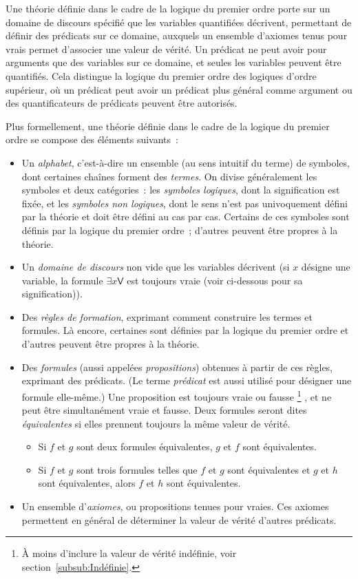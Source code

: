 Une théorie définie dans le cadre de la logique du premier ordre porte sur un domaine de discours spécifié que les variables quantifiées décrivent, permettant de définir des prédicats sur ce domaine, auxquels un ensemble d'axiomes tenus pour vrais permet d'associer une valeur de vérité. 
Un prédicat ne peut avoir pour arguments que des variables sur ce domaine, et seules les variables peuvent être quantifiés. 
Cela distingue la logique du premier ordre des logiques d'ordre supérieur, où un prédicat peut avoir un prédicat plus général comme argument ou des quantificateurs de prédicats peuvent être autorisés.

Plus formellement, une théorie définie dans le cadre de la logique du premier ordre se compose des éléments suivants : 
\begin{itemize}[nosep]
    \item Un \textit{alphabet}, c'est-à-dire un ensemble (au sens intuitif du terme) de symboles, dont certaines chaînes forment des \textit{termes}. 
          On divise généralement les symboles et deux catégories : les \textit{symboles logiques}, dont la signification est fixée, et les \textit{symboles non logiques}, dont le sens n'est pas univoquement défini par la théorie et doit être défini au cas par cas. 
          Certains de ces symboles sont définis par la logique du premier ordre ; d'autres peuvent être propres à la théorie. 
    \item Un \textit{domaine de discours} non vide que les variables décrivent (si $x$ désigne une variable, la formule $\exists x \mathsf{V}$ est toujours vraie (voir ci-dessous pour sa signification)).
    \item Des \textit{règles de formation}, exprimant comment construire les termes et formules. 
          Là encore, certaines sont définies par la logique du premier ordre et d'autres peuvent être propres à la théorie.
    \item Des \textit{formules} (aussi appelées \textit{propositions}) obtenues à partir de ces règles, exprimant des prédicats. 
        (Le terme \textit{prédicat} est aussi utilisé pour désigner une formule elle-même.)
        Une proposition est toujours vraie ou fausse%
        \footnote{À moins d'inclure la valeur de vérité indéfinie, voir section~\ref{subsub:Indéfinie}.}%
        , et ne peut être simultanément vraie et fausse. 
        Deux formules seront dites \textit{équivalentes} si elles prennent toujours la même valeur de vérité. 
        \begin{itemize}[nosep]
            \item Si $f$ et $g$ sont deux formules équivalentes, $g$ et $f$ sont équivalentes.
            \item Si $f$ et $g$ sont trois formules telles que $f$ et $g$ sont équivalentes et $g$ et $h$ sont équivalentes, alors $f$ et $h$ sont équivalentes.
        \end{itemize}
    \item Un ensemble d'\textit{axiomes}, ou propositions tenues pour vraies. 
          Ces axiomes permettent en général de déterminer la valeur de vérité d'autres prédicats.
\end{itemize}

